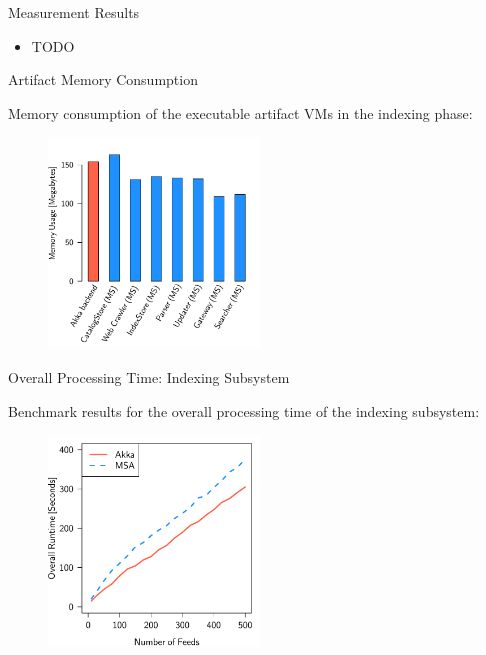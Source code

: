 \documentclass{beamer}
\begin{document}

\begin{frame}{Measurement Results}

\begin{itemize}
  \item TODO
\end{itemize}

\end{frame}


\begin{frame}{Artifact Memory Consumption}

Memory consumption of the executable artifact VMs in the indexing phase:

\begin{center}
  \begin{figure} 
    \includegraphics[width=0.5\textwidth]{graphics/eval-index-mem.pdf} 
  \end{figure}
\end{center}

\end{frame}


\begin{frame}{Overall Processing Time: Indexing Subsystem}

Benchmark results for the overall processing time of the indexing subsystem:

\begin{center}
  \begin{figure} 
    \includegraphics[width=0.5\textwidth]{graphics/eval-index-overall.pdf} 
  \end{figure}
\end{center}

\end{frame}
\end{document}
